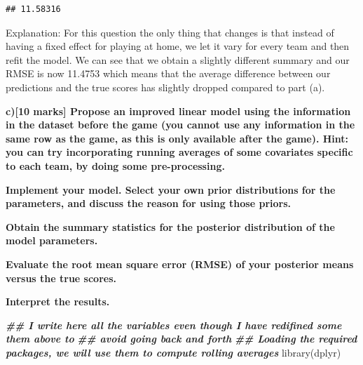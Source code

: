 \documentclass[
]{article}
\newenvironment{Shaded}{\begin{snugshade}}{\end{snugshade}}
\newcommand{\DecValTok}[1]{\textcolor[rgb]{0.00,0.00,0.81}{#1}}
\newcommand{\DocumentationTok}[1]{\textcolor[rgb]{0.56,0.35,0.01}{\textbf{\textit{#1}}}}
\newcommand{\FunctionTok}[1]{\textcolor[rgb]{0.00,0.00,0.00}{#1}}
\newcommand{\NormalTok}[1]{#1}
\newcommand{\OtherTok}[1]{\textcolor[rgb]{0.56,0.35,0.01}{#1}}
\newcommand{\SpecialCharTok}[1]{\textcolor[rgb]{0.00,0.00,0.00}{#1}}
\begin{document}
\begin{Shaded}
\end{Shaded}

\begin{verbatim}
## 11.58316
\end{verbatim}

Explanation: For this question the only thing that changes is that
instead of having a fixed effect for playing at home, we let it vary for
every team and then refit the model. We can see that we obtain a
slightly different summary and our RMSE is now 11.4753 which means that
the average difference between our predictions and the true scores has
slightly dropped compared to part (a).

\textbf{c){[}10 marks{]} Propose an improved linear model using the
information in the dataset before the game (you cannot use any
information in the same row as the game, as this is only available after
the game). Hint: you can try incorporating running averages of some
covariates specific to each team, by doing some pre-processing.}

\textbf{Implement your model. Select your own prior distributions for
the parameters, and discuss the reason for using those priors.}

\textbf{Obtain the summary statistics for the posterior distribution of
the model parameters.}

\textbf{Evaluate the root mean square error (RMSE) of your posterior
means versus the true scores.}

\textbf{Interpret the results.}

\begin{Shaded}
\begin{Highlighting}[]
\DocumentationTok{\#\# I write here all the variables even though I have redifined some them above to }
\DocumentationTok{\#\# avoid going back and forth}
\DocumentationTok{\#\# Loading the required packages, we will use them to compute rolling averages}
\FunctionTok{library}\NormalTok{(dplyr)}
\end{Highlighting}
\end{Shaded}
\end{document}
